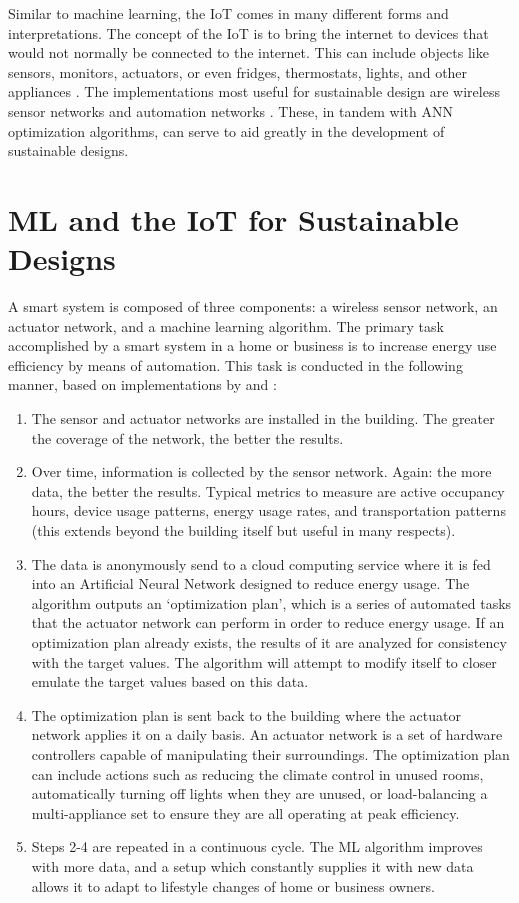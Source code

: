 \documentclass[letterpaper]{article}
\begin{document}
Similar to machine learning, the IoT comes in many different forms and interpretations. The concept of the IoT is to bring the internet to devices that would not normally be connected to the internet. This can include objects like sensors, monitors, actuators, or even fridges, thermostats, lights, and other appliances \cite{wortmann15}. The implementations most useful for sustainable design are wireless sensor networks and automation networks \cite{atzori10}. These, in tandem with ANN optimization algorithms, can serve to aid greatly in the development of sustainable designs.

\section{ML and the IoT for Sustainable Designs} \label{main}
A smart system is composed of three components: a wireless sensor network, an actuator network, and a machine learning algorithm. The primary task accomplished by a smart system in a home or business is to increase energy use efficiency by means of automation. This task is conducted in the following manner, based on implementations by \textcite{pang15} and \textcite{risteska17}:

\begin{center}
\begin{enumerate}
\item
    The sensor and actuator networks are installed in the building. The greater the coverage of the network, the better the results.
\item
    Over time, information is collected by the sensor network. Again: the more data, the better the results. Typical metrics to measure are active occupancy hours, device usage patterns, energy usage rates, and transportation patterns (this extends beyond the building itself but useful in many respects).
\item
    The data is anonymously send to a cloud computing service where it is fed into an Artificial Neural Network designed to reduce energy usage. The algorithm outputs an `optimization plan', which is a series of automated tasks that the actuator network can perform in order to reduce energy usage. If an optimization plan already exists, the results of it are analyzed for consistency with the target values. The algorithm will attempt to modify itself to closer emulate the target values based on this data.
\item
    The optimization plan is sent back to the building where the actuator network applies it on a daily basis. An actuator network is a set of hardware controllers capable of manipulating their surroundings. The optimization plan can include actions such as reducing the climate control in unused rooms, automatically turning off lights when they are unused, or load-balancing a multi-appliance set to ensure they are all operating at peak efficiency.
\item
    Steps 2-4 are repeated in a continuous cycle. The ML algorithm improves with more data, and a setup which constantly supplies it with new data allows it to adapt to lifestyle changes of home or business owners.
\end{enumerate}
\end{center}
\end{document}
